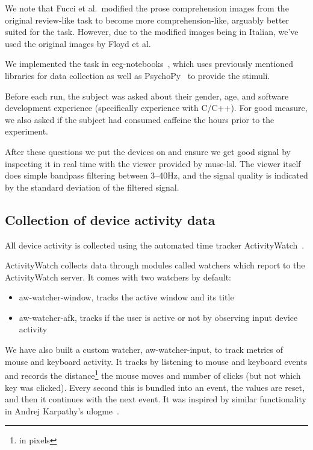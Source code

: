             We note that Fucci et al.~modified the prose comprehension images from the original review-like task to become more comprehension-like, arguably better suited for the task. However, due to the modified images being in Italian, we've used the original images by Floyd et al.

            We implemented the task in eeg-notebooks~\cite{barachant_eeg-notebooks_2020}, which uses previously mentioned libraries for data collection as well as PsychoPy~\cite{peirce_psychopy2_2019} to provide the stimuli.

            Before each run, the subject was asked about their gender, age, and software development experience (specifically experience with C/C++). For good measure, we also asked if the subject had consumed caffeine the hours prior to the experiment.

            After these questions we put the devices on and ensure we get good signal by inspecting it in real time with the viewer provided by muse-lsl. The viewer itself does simple bandpass filtering between 3--40Hz, and the signal quality is indicated by the standard deviation of the filtered signal.

    \pagebreak
    \subsection{Collection of device activity data}

        All device activity is collected using the automated time tracker ActivityWatch~\cite{bjareholt_activitywatch_2020-1}.

        ActivityWatch collects data through modules called watchers which report to the ActivityWatch server. It comes with two watchers by default:

        \begin{itemize}
            \item aw-watcher-window, tracks the active window and its title
            \item aw-watcher-afk, tracks if the user is active or not by observing input device activity
        \end{itemize}

        We have also built a custom watcher, aw-watcher-input, to track metrics of mouse and keyboard activity. It tracks by listening to mouse and keyboard events and records the distance\footnote{in pixels} the mouse moves and number of clicks (but not which key was clicked). Every second this is bundled into an event, the values are reset, and then it continues with the next event. It was inspired by similar functionality in Andrej Karpathy's ulogme~\cite{karpathy_ulogme_2016}.

